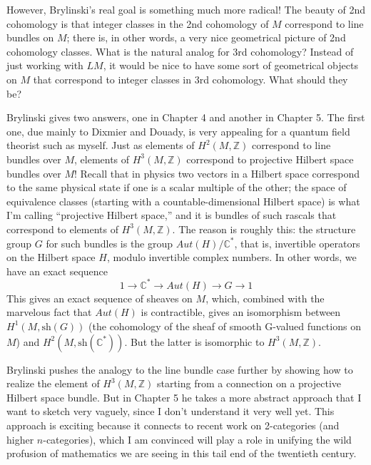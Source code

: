 \documentclass{article}
\begin{document}
However, Brylinski's real goal is something much more radical! The
beauty of 2nd cohomology is that integer classes in the 2nd cohomology
of \(M\) correspond to line bundles on \(M\); there is, in other words,
a very nice geometrical picture of 2nd cohomology classes. What is the
natural analog for 3rd cohomology? Instead of just working with \(LM\),
it would be nice to have some sort of geometrical objects on \(M\) that
correspond to integer classes in 3rd cohomology. What should they be?

Brylinski gives two answers, one in Chapter 4 and another in Chapter 5.
The first one, due mainly to Dixmier and Douady, is very appealing for a
quantum field theorist such as myself. Just as elements of
\(H^2(M,\mathbb{Z})\) correspond to line bundles over \(M\), elements of
\(H^3(M,\mathbb{Z})\) correspond to projective Hilbert space bundles
over \(M\)! Recall that in physics two vectors in a Hilbert space
correspond to the same physical state if one is a scalar multiple of the
other; the space of equivalence classes (starting with a
countable-dimensional Hilbert space) is what I'm calling ``projective
Hilbert space,'' and it is bundles of such rascals that correspond to
elements of \(H^3(M,\mathbb{Z})\). The reason is roughly this: the
structure group \(G\) for such bundles is the group
\(Aut(H)/\mathbb{C}^*\), that is, invertible operators on the Hilbert
space \(H\), modulo invertible complex numbers. In other words, we have
an exact sequence \[1 \to \mathbb{C}^* \to Aut(H) \to G \to 1\] This
gives an exact sequence of sheaves on \(M\), which, combined with the
marvelous fact that \(Aut(H)\) is contractible, gives an isomorphism
between \(H^1(M,\mathrm{sh}(G))\) (the cohomology of the sheaf of smooth
G-valued functions on \(M\)) and \(H^2(M,\mathrm{sh}(\mathbb{C}^*))\).
But the latter is isomorphic to \(H^3(M,\mathbb{Z})\).

Brylinski pushes the analogy to the line bundle case further by showing
how to realize the element of \(H^3(M,\mathbb{Z})\) starting from a
connection on a projective Hilbert space bundle. But in Chapter 5 he
takes a more abstract approach that I want to sketch very vaguely, since
I don't understand it very well yet. This approach is exciting because
it connects to recent work on 2-categories (and higher
\(n\)-categories), which I am convinced will play a role in unifying the
wild profusion of mathematics we are seeing in this tail end of the
twentieth century.
\end{document}
